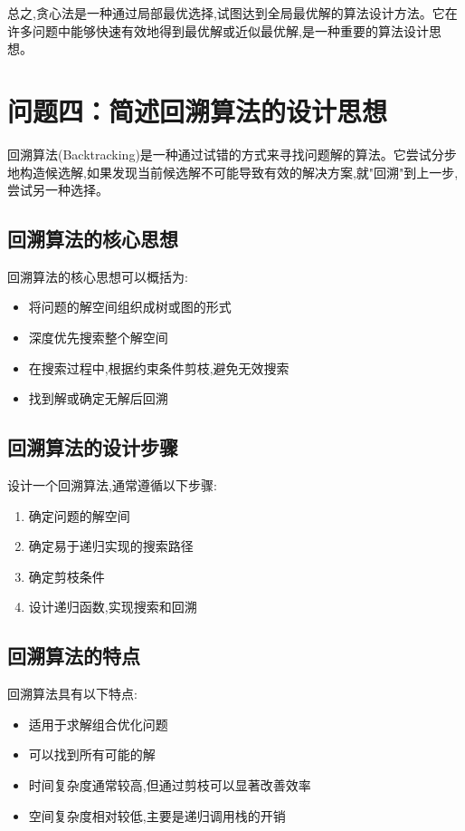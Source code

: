 \documentclass[12pt]{article}
\begin{document}
总之,贪心法是一种通过局部最优选择,试图达到全局最优解的算法设计方法。它在许多问题中能够快速有效地得到最优解或近似最优解,是一种重要的算法设计思想。

\section{问题四：简述回溯算法的设计思想}

回溯算法(Backtracking)是一种通过试错的方式来寻找问题解的算法。它尝试分步地构造候选解,如果发现当前候选解不可能导致有效的解决方案,就"回溯"到上一步,尝试另一种选择。

\subsection{回溯算法的核心思想}

回溯算法的核心思想可以概括为:
\begin{itemize}
\item 将问题的解空间组织成树或图的形式
\item 深度优先搜索整个解空间
\item 在搜索过程中,根据约束条件剪枝,避免无效搜索
\item 找到解或确定无解后回溯
\end{itemize}

\subsection{回溯算法的设计步骤}

设计一个回溯算法,通常遵循以下步骤:

\begin{enumerate}
\item 确定问题的解空间
\item 确定易于递归实现的搜索路径
\item 确定剪枝条件
\item 设计递归函数,实现搜索和回溯
\end{enumerate}

\subsection{回溯算法的特点}

回溯算法具有以下特点:
\begin{itemize}
\item 适用于求解组合优化问题
\item 可以找到所有可能的解
\item 时间复杂度通常较高,但通过剪枝可以显著改善效率
\item 空间复杂度相对较低,主要是递归调用栈的开销
\end{itemize}
\end{document}
